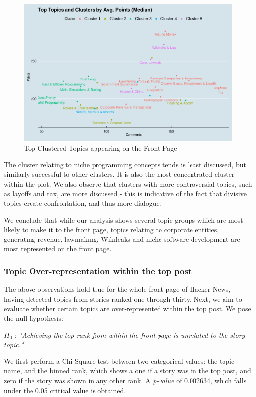 \documentclass[11pt,journal,final,a4paper]{IEEEtran}
\begin{document}
\begin{figure}[!ht]
\centerline{\includegraphics[scale=0.4]{img/topic_model_02_plot_clusters.png}}
\caption{Top Clustered Topics appearing on the Front Page}
\label{covar}
\end{figure}

The cluster relating to niche programming concepts tends is least discussed, but similarly successful to other clusters. It is also the most concentrated cluster within the plot. We also observe that clusters with more controversial topics, such as layoffs and tax, are more discussed - this is indicative of the fact that divisive topics create confrontation, and thus more dialogue. 

We conclude that while our analysis shows several topic groups which are most likely to make it to the front page, topics relating to corporate entities, generating revenue, lawmaking, Wikileaks and niche software development are most represented on the front page. 

\subsubsection{Topic Over-representation within the top post}
The above observations hold true for the whole front page of Hacker News, having detected topics from stories ranked one through thirty. Next, we aim to evaluate whether certain topics are over-represented within the top post. We pose the null hypothesis:
 
$H_{0}$ : \textit{"Achieving the top rank from within the front page is unrelated to the story topic."} 

We first perform a Chi-Square test between two categorical values: the topic name, and the binned rank, which shows a one if a story was in the top post, and zero if the story was shown in any other rank. A \textit{p-value} of 0.002634, which falls under the 0.05 critical value is obtained. 
\end{document}
